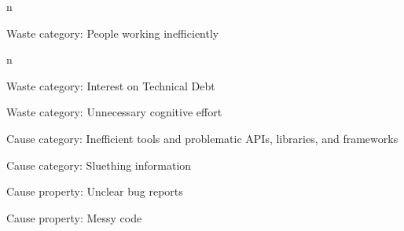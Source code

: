 n{Waste category: People working inefficiently

%
%
%
%
%
%
%
n{Waste category: Interest on Technical Debt


Waste category: Unnecessary cognitive effort

\quad Cause category: Inefficient tools and problematic APIs, libraries, and frameworks

\quad Cause category: Sluething information

\quad \quad Cause property: Unclear bug reports

\quad \quad Cause property: Messy code

}}
